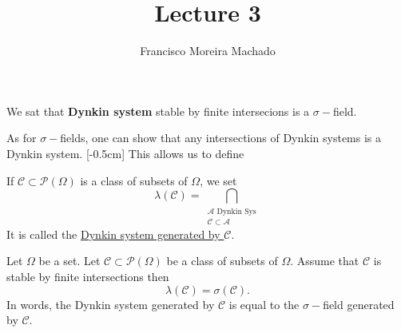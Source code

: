 \documentclass[../main.tex]{subfiles}
\author{Francisco Moreira Machado}
\title{Lecture 3}
\begin{document}
We sat that \textbf{Dynkin system} stable by finite intersecions is a $\sigma-$field.

As for $\sigma-$fields, one can show that any intersections of Dynkin systems is a Dynkin
system. [-0.5cm] This allows us to define

\begin{definition}
    If $\mathcal{C} \subset \mathcal{P}(\Omega)$ is a class of subsets of $\Omega$, we set
    $$\lambda(\mathcal{C}) = \bigcap_{\substack{\mathcal{A} \text{ Dynkin Sys} \\ \mathcal{C}
    \subset \mathcal{A}}}$$
    It is called the \underline{Dynkin system generated by $\mathcal{C}$}.
\end{definition}

\begin{theorem*}
  Let $\Omega$ be a set. Let $\mathcal{C} \subset \mathcal{P}(\Omega)$ be a class of subsets of
  $\Omega$. Assume that $\mathcal{C}$ is stable by finite intersections then
  \[
  \lambda(\mathcal{C}) = \sigma(\mathcal{C})
  .\] 
  In words, the Dynkin system generated by $\mathcal{C}$ is equal to the $\sigma-$field
  generated by $\mathcal{C}$.
\end{theorem*}
\end{document}
